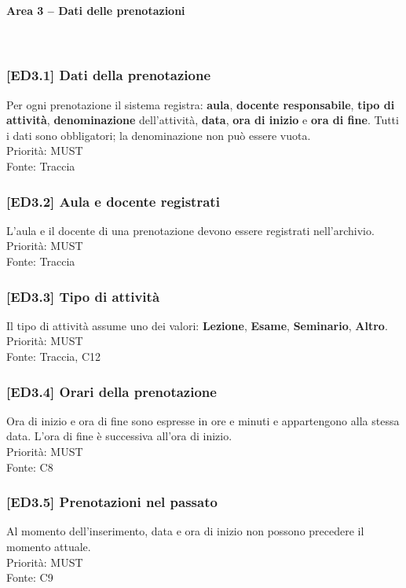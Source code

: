 \paragraph{Area 3 – Dati delle prenotazioni}~\\
\subsubsection{[ED3.1] Dati della prenotazione}
Per ogni prenotazione il sistema registra: \textbf{aula}, \textbf{docente responsabile}, \textbf{tipo di attività}, \textbf{denominazione} dell'attività, \textbf{data}, \textbf{ora di inizio} e \textbf{ora di fine}. Tutti i dati sono obbligatori; la denominazione non può essere vuota.\\
Priorità: MUST\\Fonte: Traccia

\subsubsection{[ED3.2] Aula e docente registrati}
L'aula e il docente di una prenotazione devono essere registrati nell'archivio.\\
Priorità: MUST\\Fonte: Traccia

\subsubsection{[ED3.3] Tipo di attività}
Il tipo di attività assume uno dei valori: \textbf{Lezione}, \textbf{Esame}, \textbf{Seminario}, \textbf{Altro}.\\
Priorità: MUST\\Fonte: Traccia, C12

\subsubsection{[ED3.4] Orari della prenotazione}
Ora di inizio e ora di fine sono espresse in ore e minuti e appartengono alla stessa data. L'ora di fine è successiva all'ora di inizio.\\
Priorità: MUST\\Fonte: C8

\subsubsection{[ED3.5] Prenotazioni nel passato}
Al momento dell'inserimento, data e ora di inizio non possono precedere il momento attuale.\\
Priorità: MUST\\Fonte: C9

